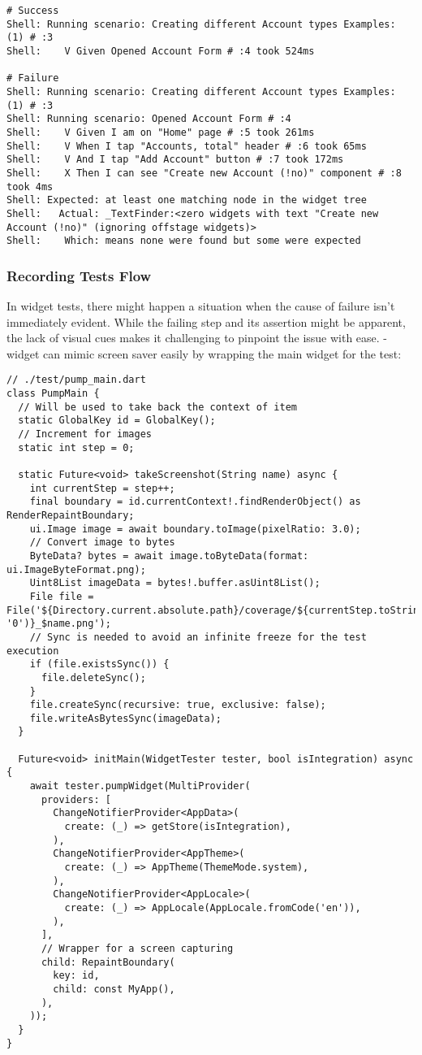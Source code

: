 \begin{lstlisting}[language=terminal]
# Success
Shell: Running scenario: Creating different Account types Examples: (1) # :3
Shell:    V Given Opened Account Form # :4 took 524ms

# Failure
Shell: Running scenario: Creating different Account types Examples: (1) # :3
Shell: Running scenario: Opened Account Form # :4
Shell:    V Given I am on "Home" page # :5 took 261ms
Shell:    V When I tap "Accounts, total" header # :6 took 65ms
Shell:    V And I tap "Add Account" button # :7 took 172ms
Shell:    X Then I can see "Create new Account (!no)" component # :8 took 4ms  
Shell: Expected: at least one matching node in the widget tree
Shell:   Actual: _TextFinder:<zero widgets with text "Create new Account (!no)" (ignoring offstage widgets)>
Shell:    Which: means none were found but some were expected
\end{lstlisting}


\subsubsection{Recording Tests Flow} \label{t-record}

In widget tests, there might happen a situation when the cause of failure isn't immediately evident. While the failing 
step and its assertion might be apparent, the lack of visual cues makes it challenging to pinpoint the issue with ease.
-widget can mimic screen saver easily by wrapping the main widget for the test:

\begin{lstlisting}
// ./test/pump_main.dart
class PumpMain {
  // Will be used to take back the context of item
  static GlobalKey id = GlobalKey();
  // Increment for images
  static int step = 0;

  static Future<void> takeScreenshot(String name) async {
    int currentStep = step++;
    final boundary = id.currentContext!.findRenderObject() as RenderRepaintBoundary;
    ui.Image image = await boundary.toImage(pixelRatio: 3.0);
    // Convert image to bytes
    ByteData? bytes = await image.toByteData(format: ui.ImageByteFormat.png);
    Uint8List imageData = bytes!.buffer.asUint8List();
    File file = File('${Directory.current.absolute.path}/coverage/${currentStep.toString().padLeft(8, '0')}_$name.png');
    // Sync is needed to avoid an infinite freeze for the test execution
    if (file.existsSync()) {
      file.deleteSync();
    }
    file.createSync(recursive: true, exclusive: false);
    file.writeAsBytesSync(imageData);
  }

  Future<void> initMain(WidgetTester tester, bool isIntegration) async {
    await tester.pumpWidget(MultiProvider(
      providers: [
        ChangeNotifierProvider<AppData>(
          create: (_) => getStore(isIntegration),
        ),
        ChangeNotifierProvider<AppTheme>(
          create: (_) => AppTheme(ThemeMode.system),
        ),
        ChangeNotifierProvider<AppLocale>(
          create: (_) => AppLocale(AppLocale.fromCode('en')),
        ),
      ],
      // Wrapper for a screen capturing
      child: RepaintBoundary(
        key: id,
        child: const MyApp(),
      ),
    ));
  }
}
\end{lstlisting}

